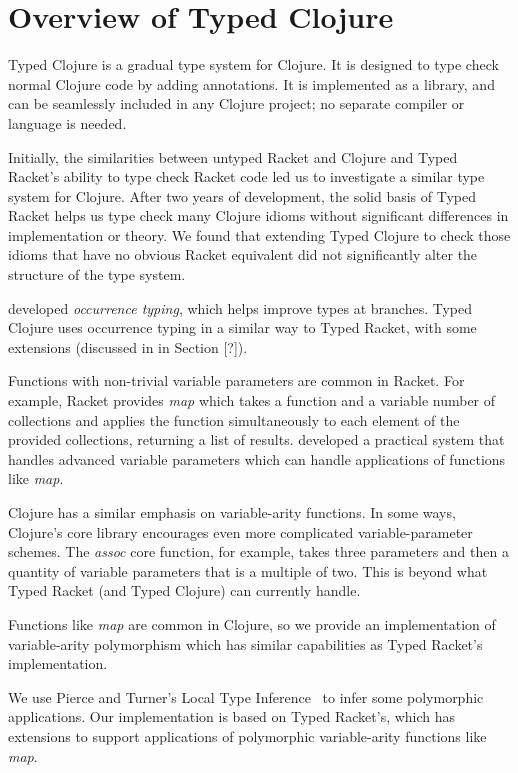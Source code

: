 \section{Overview of Typed Clojure}

Typed Clojure is a gradual type system for Clojure. It is designed
to type check normal Clojure code by adding annotations. It is implemented
as a library, and can be seamlessly included in any Clojure project; no
separate compiler or language is needed.

{}
Initially, the similarities between untyped Racket and Clojure and Typed Racket's 
ability to type check Racket code led us to investigate a similar type system for Clojure.
After two years of development, the solid basis of Typed Racket 
helps us type check many Clojure idioms without significant differences
in implementation or theory. We found that extending Typed Clojure to check
those idioms that have no obvious Racket equivalent did not significantly alter the structure
of the type system.

{}
\citet{TF08,TF10} developed \emph{occurrence typing}, which helps improve types at branches.
Typed Clojure uses occurrence typing in a similar way to Typed Racket, with
some extensions (discussed in in Section [?]). %

{}
Functions with non-trivial variable parameters are common in Racket.
For example, Racket provides \emph{map} which takes a function and a
variable number of collections and applies the function simultaneously
to each element of the provided collections, returning a list of results.
\citet*{STF09} developed a practical system that handles advanced variable parameters
which can handle applications of functions like \emph{map}.

Clojure has a similar emphasis on variable-arity functions. In some ways,
Clojure's core library encourages even more complicated variable-parameter schemes.
The \emph{assoc} core function, for example, takes three parameters and
then a quantity of variable parameters that is a multiple of two.
This is beyond what Typed Racket (and Typed Clojure) can currently handle. 

Functions like \emph{map} are common in Clojure, so we provide an implementation
of variable-arity polymorphism which has similar capabilities as Typed Racket's
implementation.

{}
We use Pierce and Turner's Local Type Inference~\cite{PT00} to infer some polymorphic
applications. Our implementation is based on Typed Racket's, which has extensions
to support applications of polymorphic variable-arity functions like \emph{map}.

